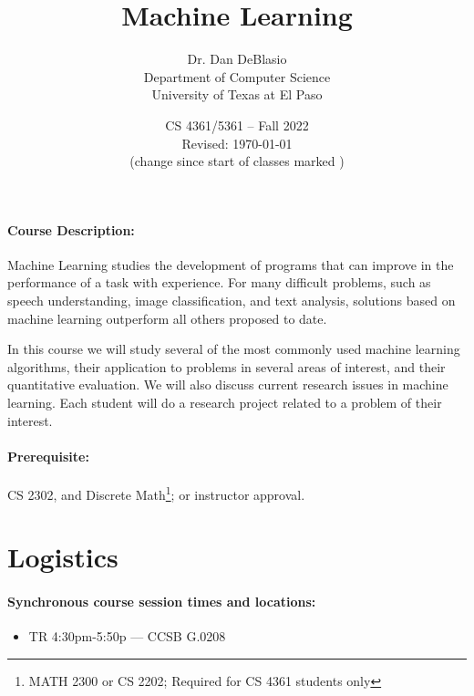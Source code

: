 \documentclass[12pt]{scrartcl}
\title{Machine Learning}\let\Title\@title
\subtitle{
{\small
Dr. Dan DeBlasio\\
Department of Computer Science\\
University of Texas at El Paso\\
}
\vskip-1cm}
\date{\small CS 4361/5361 -- Fall 2022\\ \vspace{1em}Revised: \today\\(change since start of classes marked \change{}{in orange})}
\begin{document}

\maketitle
%
%
\paragraph{Course Description:} Machine Learning studies the development of programs that can improve in the performance of a task with experience. 
For many difficult problems, such as speech understanding, image classification, and text analysis, solutions based on machine learning outperform all others proposed to date. 

In this course we will study several of the most commonly used machine learning algorithms, their application to problems in several areas of interest, and their quantitative evaluation. 
We will also discuss current research issues in machine learning. 
Each student will do a research project related to a problem of their interest.

\paragraph{Prerequisite:} CS 2302, and Discrete Math\footnote{MATH 2300 or CS 2202; Required for CS 4361 students only}; or instructor approval.

\clearpage
\tableofcontents

\section{Logistics}
\paragraph{Synchronous course session times and locations:}
\begin{itemize}
\item TR 4:30pm-5:50p --- CCSB G.0208
\end{itemize}
\end{document}
